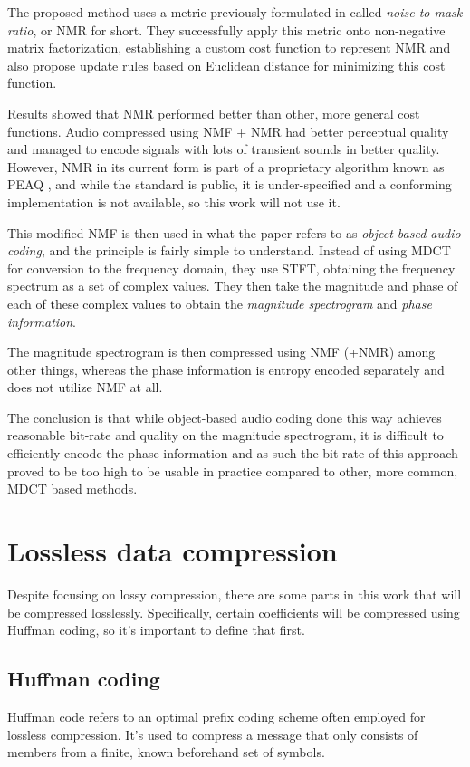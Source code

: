 The proposed method uses a metric previously formulated in \cite{Nikunen2010NoisetomaskRM} called \emph{noise-to-mask ratio}, or NMR for short. They successfully apply this metric onto non-negative matrix factorization, establishing a custom cost function to represent NMR and also propose update rules based on Euclidean distance for minimizing this cost function.

Results showed that NMR performed better than other, more general cost functions. Audio compressed using NMF + NMR had better perceptual quality and managed to encode signals with lots of transient sounds in better quality. However, NMR in its current form is part of a proprietary algorithm known as PEAQ \cite{peaq_2006}, and while the standard is public, it is under-specified and a conforming implementation is not available, so this work will not use it.

This modified NMF is then used in what the paper refers to as \emph{object-based audio coding}, and the principle is fairly simple to understand. Instead of using MDCT for conversion to the frequency domain, they use STFT, obtaining the frequency spectrum as a set of complex values. They then take the magnitude and phase of each of these complex values to obtain the \emph{magnitude spectrogram} and \emph{phase information}.

The magnitude spectrogram is then compressed using NMF (+NMR) among other things, whereas the phase information is entropy encoded separately and does not utilize NMF at all.

The conclusion is that while object-based audio coding done this way achieves reasonable bit-rate and quality on the magnitude spectrogram, it is difficult to efficiently encode the phase information and as such the bit-rate of this approach proved to be too high to be usable in practice compared to other, more common, MDCT based methods.

\section{Lossless data compression}
Despite focusing on lossy compression, there are some parts in this work that will be compressed losslessly. Specifically, certain coefficients will be compressed using Huffman coding, so it's important to define that first.

\subsection{Huffman coding}
\label{sec:huffman}
Huffman code refers to an optimal prefix coding scheme often employed for lossless compression. It's used to compress a message that only consists of members from a finite, known beforehand set of symbols. \cite{huffman_1952}

